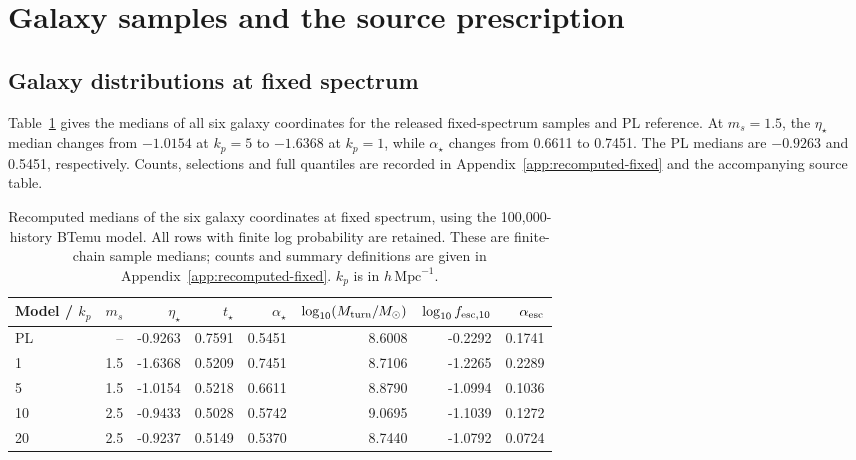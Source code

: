 \section{Galaxy samples and the source prescription}\label{inference-status}

\subsection{Galaxy distributions at fixed spectrum}\label{fixed-spectrum-100k}

Table~\ref{tab:fixed-100k} gives the medians of all six galaxy coordinates for the released fixed-spectrum samples and PL reference. At $m_s=1.5$, the $\eta_\star$ median changes from $-1.0154$ at $k_p=5$ to $-1.6368$ at $k_p=1$, while $\alpha_\star$ changes from 0.6611 to 0.7451. The PL medians are $-0.9263$ and 0.5451, respectively. Counts, selections and full quantiles are recorded in Appendix~\ref{app:recomputed-fixed} and the accompanying source table.

\begin{table}[t]\centering\small
\caption{Recomputed medians of the six galaxy coordinates at fixed spectrum, using the 100,000-history BTemu model. All rows with finite log probability are retained. These are finite-chain sample medians; counts and summary definitions are given in Appendix~\ref{app:recomputed-fixed}. $k_p$ is in $h\,\mathrm{Mpc}^{-1}$.}\label{tab:fixed-100k}
\begin{tabular*}{\textwidth}{@{\extracolsep{\fill}}lrrrrrrr}\toprule
Model / $k_p$ & $m_s$ & $\eta_\star$ & $t_\star$ & $\alpha_\star$ & $\log_{10}(M_{\rm turn}/M_\odot)$ & $\log_{10} f_{{\rm esc},10}$ & $\alpha_{\rm esc}$\\\midrule
PL & -- & -0.9263 & 0.7591 & 0.5451 & 8.6008 & -0.2292 & 0.1741\\
1 & 1.5 & -1.6368 & 0.5209 & 0.7451 & 8.7106 & -1.2265 & 0.2289\\
5 & 1.5 & -1.0154 & 0.5218 & 0.6611 & 8.8790 & -1.0994 & 0.1036\\
10 & 2.5 & -0.9433 & 0.5028 & 0.5742 & 9.0695 & -1.1039 & 0.1272\\
20 & 2.5 & -0.9237 & 0.5149 & 0.5370 & 8.7440 & -1.0792 & 0.0724\\
\bottomrule\end{tabular*}\end{table}

